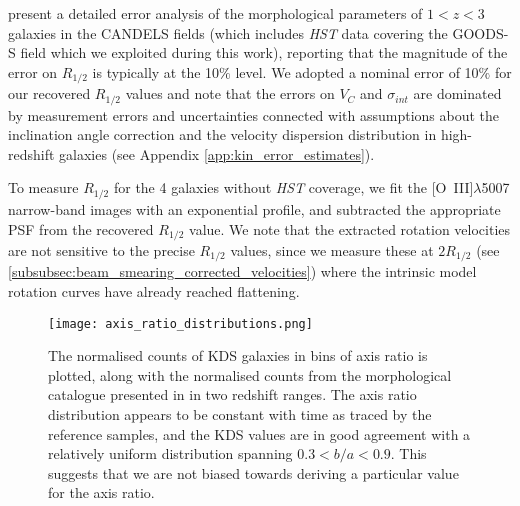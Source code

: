 \documentclass[fleqn,usenatbib]{mnras}
\begin{document}

\cite{Bruce2012} present a detailed error analysis of the morphological parameters of $1 < z < 3$ galaxies in the CANDELS fields (which includes {\em HST} data covering the GOODS-S field which we exploited during this work), reporting that the magnitude of the error on $R_{1/2}$ is typically at the 10$\%$ level.
We adopted a nominal error of 10$\%$ for our recovered $R_{1/2}$ values and note that the errors on $V_{C}$ and $\sigma_{int}$ are dominated by measurement errors and uncertainties connected with assumptions about the inclination angle correction and the velocity dispersion distribution in high-redshift galaxies (see Appendix \ref{app:kin_error_estimates}).


To measure $R_{1/2}$ for the 4 galaxies without {\em HST} coverage, we fit the [O~{\sc III}]$\lambda$5007 narrow-band images with an exponential profile, and subtracted the appropriate PSF from the recovered $R_{1/2}$ value.
We note that the extracted rotation velocities are not sensitive to the precise $R_{1/2}$ values, since we measure these at $2R_{1/2}$ (see \cref{subsubsec:beam_smearing_corrected_velocities}) where the intrinsic model rotation curves have already reached flattening.

\begin{figure}
\centering \hspace{-1.13cm}
\texttt{[image: axis\_ratio\_distributions.png]}
\caption{The normalised counts of KDS galaxies in bins of axis ratio is plotted, along with the normalised counts from the morphological catalogue presented in \protect\cite{VanderWel2012} in two redshift ranges.
The axis ratio distribution appears to be constant with time as traced by the reference samples, and the KDS values are in good agreement with a relatively uniform distribution spanning $0.3 < b/a < 0.9$.
This suggests that we are not biased towards deriving a particular value for the axis ratio.}
\label{fig:morpho-distributions}
\end{figure}
\end{document}
